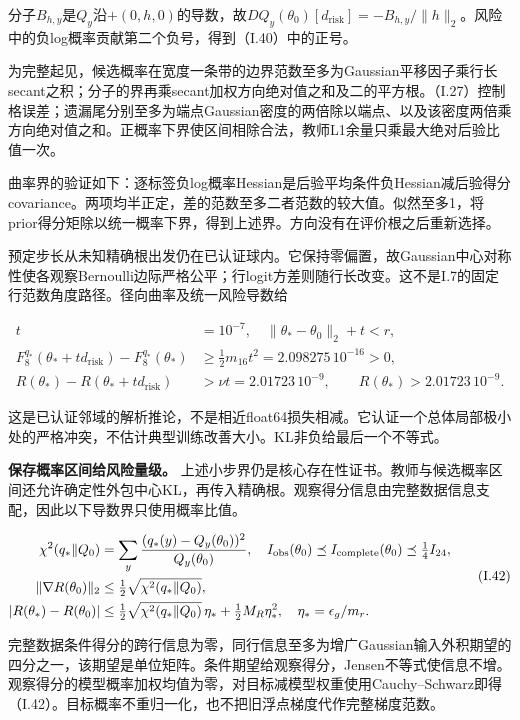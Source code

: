 \documentclass[11pt,a4paper]{article}
\begin{document}
分子\(B_{h,y}\)是\(Q_y\)沿\(+(0,h,0)\)的导数，故\(DQ_y(\theta_0)[d_{\mathrm{risk}}]=-B_{h,y}/\|h\|_2\)。风险中的负log概率贡献第二个负号，得到（I.40）中的正号。

为完整起见，候选概率在宽度一条带的边界范数至多为Gaussian平移因子乘行长secant之积；分子的界再乘secant加权方向绝对值之和及二的平方根。（I.27）控制格误差；遗漏尾分别至多为端点Gaussian密度的两倍除以端点、以及该密度两倍乘方向绝对值之和。正概率下界使区间相除合法，教师L1余量只乘最大绝对后验比值一次。

曲率界的验证如下：逐标签负log概率Hessian是后验平均条件负Hessian减后验得分covariance。两项均半正定，差的范数至多二者范数的较大值。似然至多1，将prior得分矩除以统一概率下界，得到上述界。方向没有在评价根之后重新选择。

预定步长从未知精确根出发仍在已认证球内。它保持零偏置，故Gaussian中心对称性使各观察Bernoulli边际严格公平；行logit方差则随行长改变。这不是I.7的固定行范数角度路径。径向曲率及统一风险导数给

\[
\begin{aligned}
t&=10^{-7},\quad \|\theta_*-\theta_0\|_2+t<r,\\
F_8^{q_*}(\theta_*+td_{\mathrm{risk}})-F_8^{q_*}(\theta_*)&\ge\tfrac12m_{16}t^2=2.098275\,10^{-16}>0,\\
R(\theta_*)-R(\theta_*+td_{\mathrm{risk}})&>\nu t=2.01723\,10^{-9},\qquad
R(\theta_*)>2.01723\,10^{-9}.
\end{aligned}
\tag{I.41}
\]

这是已认证邻域的解析推论，不是相近float64损失相减。它认证一个总体局部极小处的严格冲突，不估计典型训练改善大小。KL非负给最后一个不等式。

\textbf{保存概率区间给风险量级。}
上述小步界仍是核心存在性证书。教师与候选概率区间还允许确定性外包中心KL，再传入精确根。观察得分信息由完整数据信息支配，因此以下导数界只使用概率比值。

\[
\begin{aligned}
\chi^2(q_*\Vert Q_0)&=\sum_y\frac{(q_*(y)-Q_y(\theta_0))^2}{Q_y(\theta_0)},\quad
I_{\rm obs}(\theta_0)\preceq I_{\rm complete}(\theta_0)\preceq\tfrac14I_{24},\\
\|\nabla R(\theta_0)\|_2&\le\tfrac12\sqrt{\chi^2(q_*\Vert Q_0)},\\
|R(\theta_*)-R(\theta_0)|&\le\tfrac12\sqrt{\chi^2(q_*\Vert Q_0)}\,\eta_*+\tfrac12M_R\eta_*^2,\quad
\eta_*=\epsilon_g/m_r.
\end{aligned}
\tag{I.42}
\]

完整数据条件得分的跨行信息为零，同行信息至多为增广Gaussian输入外积期望的四分之一，该期望是单位矩阵。条件期望给观察得分，Jensen不等式使信息不增。观察得分的模型概率加权均值为零，对目标减模型权重使用Cauchy--Schwarz即得（I.42）。目标概率不重归一化，也不把旧浮点梯度代作完整梯度范数。
\end{document}
